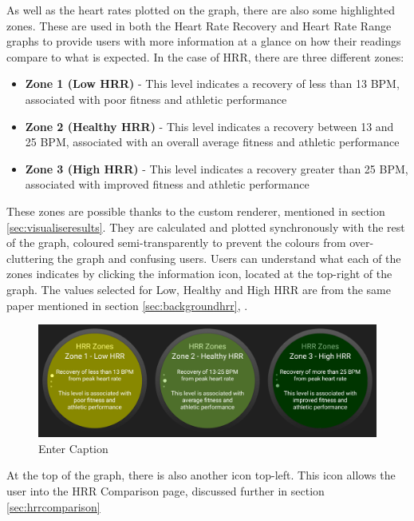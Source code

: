 \documentclass{l4proj}
\begin{document}
As well as the heart rates plotted on the graph, there are also some highlighted zones. These are used in both the Heart Rate Recovery and Heart Rate Range graphs to provide users with more information at a glance on how their readings compare to what is expected. In the case of HRR, there are three different zones:

\begin{itemize}
    \item \textbf{Zone 1 (Low HRR)} - This level indicates a recovery of less than 13 BPM, associated with poor fitness and athletic performance
    \item \textbf{Zone 2 (Healthy HRR)} - This level indicates a recovery between 13 and 25 BPM, associated with an overall average fitness and athletic performance
    \item \textbf{Zone 3 (High HRR)} - This level indicates a recovery greater than 25 BPM, associated with improved fitness and athletic performance
\end{itemize}

These zones are possible thanks to the custom renderer, mentioned in section \ref{sec:visualiseresults}. They are calculated and plotted synchronously with the rest of the graph, coloured semi-transparently to prevent the colours from over-cluttering the graph and confusing users. Users can understand what each of the zones indicates by clicking the information icon, located at the top-right of the graph. The values selected for Low, Healthy and High HRR are from the same paper mentioned in section \ref{sec:backgroundhrr}, \cite{HRR2000}.

\begin{figure}[h!]
    \centering
    \includegraphics[width=1\linewidth]{dissertation//dissImages/CombinedHRRZones.png}
    \caption{Enter Caption}
    \label{fig:enter-label}
\end{figure}

At the top of the graph, there is also another icon top-left. This icon allows the user into the HRR Comparison page, discussed further in section \ref{sec:hrrcomparison}
\end{document}
